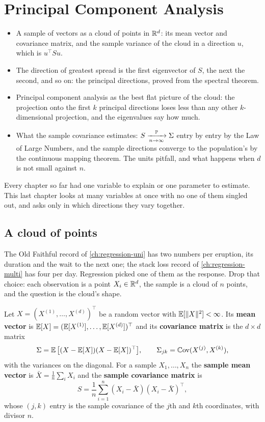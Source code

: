 \chapter{Principal Component Analysis}
\label{ch:pca}

\begin{chaptergoals}
\begin{itemize}[nosep]
\item A sample of vectors as a cloud of points in $\mathbb{R}^d$: its mean vector and covariance matrix, and the sample variance of the cloud in a direction $u$, which is $u^\top Su$.
\item The direction of greatest spread is the first eigenvector of $S$, the next the second, and so on: the principal directions, proved from the spectral theorem.
\item Principal component analysis as the best flat picture of the cloud: the projection onto the first $k$ principal directions loses less than any other $k$-dimensional projection, and the eigenvalues say how much.
\item What the sample covariance estimates: $S \xrightarrow [n \to \infty ]{\mathbb{P}} \Sigma$ entry by entry by the Law of Large Numbers, and the sample directions converge to the population's by the continuous mapping theorem. The units pitfall, and what happens when $d$ is not small against $n$.
\end{itemize}
Every chapter so far had one variable to explain or one parameter to estimate. This last chapter looks at many variables at once with no one of them singled out, and asks only in which directions they vary together.
\end{chaptergoals}

\section{A cloud of points}
\label{sec:pca-cloud}

The Old Faithful record of \cref{ch:regression-uni} has two numbers per eruption, its duration and the wait to the next one; the stack loss record of \cref{ch:regression-multi} has four per day.
Regression picked one of them as the response.
Drop that choice: each observation is a point $X_i \in \mathbb{R}^d$, the sample is a cloud of $n$ points, and the question is the cloud's shape.

\begin{definition}
\label{def:covmatrix}
Let $X = (X^{(1)}, \ldots, X^{(d)})^\top$ be a random vector with $\operatorname*{\mathbb{E}}[\lVert X\rVert^2] < \infty$.
Its \textbf{mean vector} is $\operatorname*{\mathbb{E}}[X] = (\operatorname*{\mathbb{E}}[X^{(1)}], \ldots, \operatorname*{\mathbb{E}}[X^{(d)}])^\top$ and its \textbf{covariance matrix} is the $d \times d$ matrix
\[
\Sigma = \operatorname*{\mathbb{E}}\big[(X - \operatorname*{\mathbb{E}}[X])(X - \operatorname*{\mathbb{E}}[X])^\top\big], \qquad \Sigma_{jk} = \operatorname*{\mathbb{C}\text{ov}}(X^{(j)}, X^{(k)}),
\]
with the variances on the diagonal.
For a sample $X_1, \ldots, X_n$ the \textbf{sample mean vector} is $\bar{X} = \frac1n\sum_i X_i$ and the \textbf{sample covariance matrix} is
\[
S = \frac1n\sum_{i=1}^n (X_i - \bar{X})(X_i - \bar{X})^\top,
\]
whose $(j, k)$ entry is the sample covariance of the $j$th and $k$th coordinates, with divisor $n$.
\end{definition}


